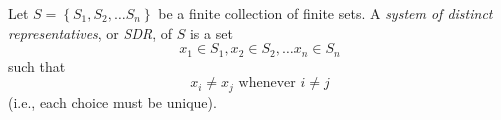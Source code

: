 \documentclass[12pt]{article}
\begin{document}
Let $S = \left\{ S_1,S_2,\dots S_n \right\}$ be a finite collection of finite sets.  A \emph{system of distinct representatives}, or \emph{SDR}, of $S$ is a set
$$x_1 \in S_1, x_2 \in S_2, \dots x_n \in S_n$$
such that
$$x_i \neq x_j \text{ whenever } i \neq j$$
(i.e., each choice must be unique).
\end{document}
